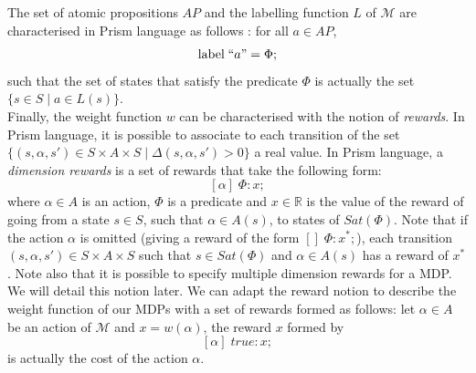 The set of atomic propositions $AP$ and the labelling function $L$ of $\mathcal{M}$ are characterised in Prism language as follows : for all $a \in AP$,
\[
  \text{label} \; ``a" = \Phi;
\]
such that the set of states that satisfy the predicate $\Phi$ is actually the set $\{ s \in S \; | \; a \in L(s) \}$. \\

%

Finally, the weight function $w$ can be characterised with the notion of \textit{rewards}. In Prism language, it is possible to associate to each transition
of the set $\{ (s, \alpha, s') \in S \times A \times S \; | \; \Delta(s, \alpha, s') > 0 \}$ a real value. In Prism language, a \textit{dimension rewards} is a set of rewards that take the following form:
\[
  [\alpha] \; \Phi : x;
\]
where $\alpha \in A$ is an action, $\Phi$ is a predicate and $x \in \mathbb{R}$
is the value of the reward of going from a state $s \in S$, such that $\alpha \in A(s)$, to states of $Sat(\Phi)$. Note that if the action $\alpha$ is omitted (giving a reward of the form $[]\; \Phi : x^*;$), each transition $(s, \alpha, s') \in S\times A \times S$ such that $s \in Sat(\Phi)$ and $\alpha \in A(s)$
has a reward of $x^*$. Note also that it is possible to specify multiple dimension rewards for a MDP. We will detail this notion later.
We can adapt the reward notion to describe the weight function of our MDPs with a set of rewards formed as follows:
let $\alpha \in A$ be an action of $\mathcal{M}$ and $x = w(\alpha)$, the reward $x$ formed by
\[
  [\alpha] \; true : x;
\]
is actually the cost of the action $\alpha$.

